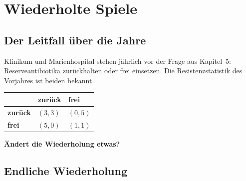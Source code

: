 \chapter{Wiederholte Spiele}

\section{Der Leitfall über die Jahre}

\begin{merksatz}
Klinikum und Marienhospital stehen jährlich vor der Frage aus Kapitel~5: Reserveantibiotika zurückhalten oder frei einsetzen. Die Resistenzstatistik des Vorjahres ist beiden bekannt.

\begin{center}
{\small
\renewcommand{\arraystretch}{1.6}
\begin{tabular}{@{}P{2.4cm}P{2.2cm}P{2.2cm}@{}}
\toprule
& \textbf{zurück} & \textbf{frei}\\
\midrule
\textbf{zurück} & $(3,3)$ & $(0,5)$\\
\textbf{frei} & $(5,0)$ & $(1,1)$\\
\bottomrule
\end{tabular}}
\end{center}

\begin{center}
\begin{minipage}{0.9\textwidth}
\textbf{Ändert die Wiederholung etwas?}
\end{minipage}
\end{center}

\begin{center}
\begin{minipage}{0.88\textwidth}
\end{minipage}
\end{center}
\end{merksatz}

\section{Endliche Wiederholung}


